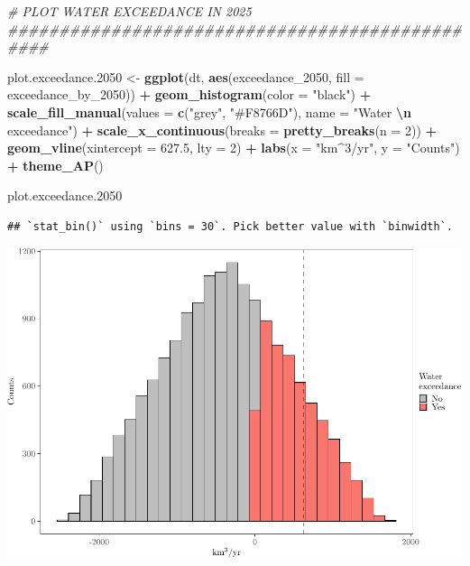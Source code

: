\documentclass[
  11pt,
]{article}
\newenvironment{Shaded}{\begin{snugshade}}{\end{snugshade}}
\newcommand{\AttributeTok}[1]{\textcolor[rgb]{0.13,0.29,0.53}{#1}}
\newcommand{\CommentTok}[1]{\textcolor[rgb]{0.56,0.35,0.01}{\textit{#1}}}
\newcommand{\DecValTok}[1]{\textcolor[rgb]{0.00,0.00,0.81}{#1}}
\newcommand{\FloatTok}[1]{\textcolor[rgb]{0.00,0.00,0.81}{#1}}
\newcommand{\FunctionTok}[1]{\textcolor[rgb]{0.13,0.29,0.53}{\textbf{#1}}}
\newcommand{\NormalTok}[1]{#1}
\newcommand{\OtherTok}[1]{\textcolor[rgb]{0.56,0.35,0.01}{#1}}
\newcommand{\SpecialCharTok}[1]{\textcolor[rgb]{0.81,0.36,0.00}{\textbf{#1}}}
\newcommand{\StringTok}[1]{\textcolor[rgb]{0.31,0.60,0.02}{#1}}
\begin{document}
\begin{Shaded}
\begin{Highlighting}[]
\CommentTok{\# PLOT WATER EXCEEDANCE IN 2025 \#\#\#\#\#\#\#\#\#\#\#\#\#\#\#\#\#\#\#\#\#\#\#\#\#\#\#\#\#\#\#\#\#\#\#\#\#\#\#\#\#\#\#\#\#\#\#\#}

\NormalTok{plot.exceedance}\FloatTok{.2050} \OtherTok{\textless{}{-}} \FunctionTok{ggplot}\NormalTok{(dt, }\FunctionTok{aes}\NormalTok{(exceedance\_2050, }\AttributeTok{fill =}\NormalTok{ exceedance\_by\_2050)) }\SpecialCharTok{+}
  \FunctionTok{geom\_histogram}\NormalTok{(}\AttributeTok{color =} \StringTok{"black"}\NormalTok{) }\SpecialCharTok{+}
  \FunctionTok{scale\_fill\_manual}\NormalTok{(}\AttributeTok{values =} \FunctionTok{c}\NormalTok{(}\StringTok{"grey"}\NormalTok{, }\StringTok{"\#F8766D"}\NormalTok{), }
                    \AttributeTok{name =} \StringTok{"Water }\SpecialCharTok{\textbackslash{}n}\StringTok{ exceedance"}\NormalTok{) }\SpecialCharTok{+}
  \FunctionTok{scale\_x\_continuous}\NormalTok{(}\AttributeTok{breaks =} \FunctionTok{pretty\_breaks}\NormalTok{(}\AttributeTok{n =} \DecValTok{2}\NormalTok{)) }\SpecialCharTok{+}
  \FunctionTok{geom\_vline}\NormalTok{(}\AttributeTok{xintercept =} \FloatTok{627.5}\NormalTok{, }\AttributeTok{lty =} \DecValTok{2}\NormalTok{) }\SpecialCharTok{+}
  \FunctionTok{labs}\NormalTok{(}\AttributeTok{x =} \StringTok{"km$\^{}3$/yr"}\NormalTok{, }\AttributeTok{y =} \StringTok{"Counts"}\NormalTok{) }\SpecialCharTok{+}
  \FunctionTok{theme\_AP}\NormalTok{() }

\NormalTok{plot.exceedance}\FloatTok{.2050}
\end{Highlighting}
\end{Shaded}

\begin{verbatim}
## `stat_bin()` using `bins = 30`. Pick better value with `binwidth`.
\end{verbatim}

\includegraphics{code_fallacies_water_crisis_files/figure-latex/rest-6.pdf}
\end{document}
